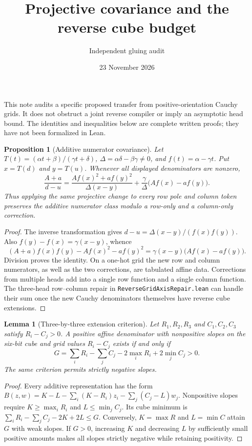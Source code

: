 \documentclass[11pt]{article}
\title{Projective covariance and the reverse cube budget}
\author{Independent gluing audit}
\date{23 November 2026}
\newtheorem{proposition}{Proposition}
\newtheorem{lemma}{Lemma}
\begin{document}
\maketitle

This note audits a specific proposed transfer from positive-orientation
Cauchy grids. It does not obstruct a joint reverse compiler or imply an
asymptotic head bound. The identities and inequalities below are complete
written proofs; they have not been formalized in Lean.

\begin{proposition}[Additive numerator covariance]
Let $T(t)=(\alpha t+\beta)/(\gamma t+\delta)$,
$\Delta=\alpha\delta-\beta\gamma\ne0$, and
$f(t)=\alpha-\gamma t$. Put $x=T(d)$ and $y=T(u)$.
Whenever all displayed denominators are nonzero,
\[
 \frac{A+a}{d-u}
 =\frac{A f(x)^2+a f(y)^2}{\Delta(x-y)}
  +\frac{\gamma}{\Delta}\bigl(Af(x)-af(y)\bigr).
\]
Thus applying the same projective change to every row pole and column
token preserves the additive numerator class modulo a row-only and a
column-only correction.
\end{proposition}
\begin{proof}
The inverse transformation gives
$d-u=\Delta(x-y)/(f(x)f(y))$.
Also $f(y)-f(x)=\gamma(x-y)$, whence
\[
 (A+a)f(x)f(y)-Af(x)^2-af(y)^2
 =\gamma(x-y)\bigl(Af(x)-af(y)\bigr).
\]
Division proves the identity. On a one-hot grid the new row and column
numerators, as well as the two corrections, are tabulated affine data.
Corrections from multiple heads add into a single row function and a
single column function. The three-head row--column repair in
\texttt{ReverseGridAxisRepair.lean} can handle their sum once the new
Cauchy denominators themselves have reverse cube extensions.
\end{proof}

\begin{lemma}[Three-by-three extension criterion]
Let $R_1,R_2,R_3$ and $C_1,C_2,C_3$ satisfy $R_i-C_j>0$.
A positive affine denominator with nonpositive slopes on the six-bit
cube and grid values $R_i-C_j$ exists if and only if
\[
 G=\sum_i R_i-\sum_j C_j-2\max_iR_i+2\min_jC_j>0.
\]
The same criterion permits strictly negative slopes.
\end{lemma}
\begin{proof}
Every additive representation has the form
$B(z,w)=K-L-\sum_i(K-R_i)z_i-\sum_j(C_j-L)w_j$.
Nonpositive slopes require $K\ge\max_iR_i$ and
$L\le\min_jC_j$. Its cube minimum is
$\sum_iR_i-\sum_jC_j-2K+2L\le G$.
Conversely, $K=\max R$ and $L=\min C$ attain $G$ with weak slopes.
If $G>0$, increasing $K$ and decreasing $L$ by sufficiently small
positive amounts makes all slopes strictly negative while retaining
positivity.
\end{proof}
\end{document}
